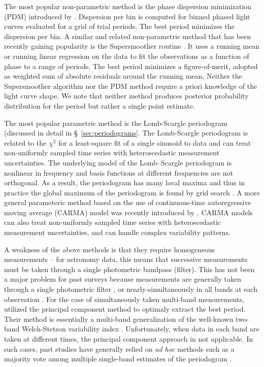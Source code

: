 \documentclass[12pt,preprint]{aastex}
\newcommand{\foreign}[1]{{\it #1}}
\newcommand{\adhoc}{\foreign{ad hoc}}
\begin{document}
The most popular non-parametric method is the phase dispersion minimization (PDM) introduced by \cite{PDM1978}. 
Dispersion per bin is computed for binned phased light curves evaluated for a grid of trial periods. The best
period minimizes the dispersion per bin.  A similar and related non-parametric method that has been recently 
gaining popularity is the Supersmoother routine \citep{Reimann94}. It uses a running mean or running linear 
regression on the data to fit the observations as a function of phase to a range of periods. The best period 
minimizes a figure-of-merit, adopted as weighted sum of absolute residuals around the running mean. 
Neither the Supersmoother algorithm nor the PDM method require a priori knowledge of the light curve shape. 
We note that neither method produces posterior probability distribution for the period but rather a single point 
estimate. 

The most popular parametric method is the Lomb-Scargle periodogram (discussed in detail in \S~\ref{sec:periodograms}.
The Lomb-Scargle periodogram is related to the $\chi^2$ for a least-square fit of a single sinusoid to data
and can treat non-uniformly sampled time series with heteroscedastic measurement uncertainties. 
The underlying model of the Lomb–Scargle periodogram is nonlinear in frequency and basis functions at different
frequencies are not orthogonal. As a result, the periodogram has many local maxima and thus in practice the global 
maximum of the periodogram is found by grid search \citep[for details see, e.g.][]{ICVG2014}.
A more general parameteric method based on the use of continuous-time autoregressive moving average (CARMA) model
was recently introduced by \citep{Kelly14}. CARMA models can also treat non-uniformly sampled time series with 
heteroscedastic measurement uncertainties, and can handle complex variability patterns. 

A weakness of the above methods is that they require homogeneous measurements -- for astronomy data, this means 
that successive measurements must be taken through a single photometric bandpass (filter). This has not been a major
problem for past surveys because measurements are generally taken through a single photometric filter 
\citep [e.g. LINEAR,][]{LINEAR1}, or nearly-simultaneously in all bands at each observation \citep [e.g. SDSS,][]{Sesar2010}.
For the case of simultaneously taken multi-band measurements, \cite{Suveges12} utilized the principal component
method to optimaly extract the best period. Their method is essentially a multi-band generalization of the well-known
two-band Welch-Stetson variability index \citep{Stetson1996}. Unfortunately, when data in each band are taken at
different times, the  principal component approach in not applicable. In such cases, past studies have generally relied 
on \adhoc{} methods such as a majority vote among multiple single-band estimates of the 
periodogram \citep[e.g.,][]{Oluseyi12}. 
\end{document}
